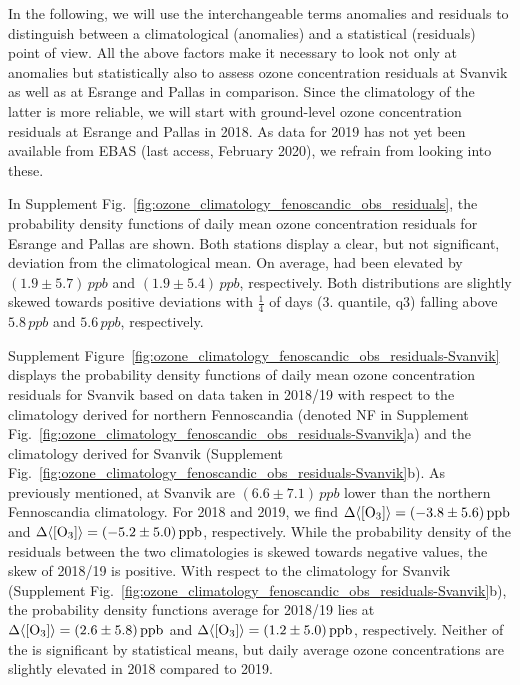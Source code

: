 \documentclass[bg, manuscript]{copernicus}
\begin{document}
In the following, we will use the interchangeable terms anomalies and residuals to distinguish between a climatological (anomalies) and a statistical (residuals) point of view.
All the above factors make it necessary to look not only at anomalies but statistically also to assess ozone concentration residuals at Svanvik as well as at Esrange and Pallas in comparison. Since the climatology of the latter is more reliable, we will start with ground-level ozone concentration residuals \chem{\Delta[O_3]} at Esrange and Pallas in 2018. As data for 2019 has not yet been available from EBAS (last access, February 2020), we refrain from looking into these.

In Supplement Fig.~\ref{fig:ozone_climatology_fenoscandic_obs_residuals}, the probability density functions of daily mean ozone concentration residuals for Esrange and Pallas are shown. Both stations display a clear, but not significant, deviation from the climatological mean. On average, \chem{[O_3]} had been elevated by $(1.9\pm 5.7)\,\unit{ppb}$ and $(1.9\pm 5.4)\,\unit{ppb}$, respectively. Both distributions are slightly skewed towards positive deviations with $\frac{1}{4}$ of days (3. quantile, q3) falling above $5.8\,\unit{ppb}$ and $5.6\,\unit{ppb}$, respectively.

Supplement Figure~\ref{fig:ozone_climatology_fenoscandic_obs_residuals-Svanvik} displays the probability density functions of daily mean ozone concentration residuals for Svanvik based on data taken in 2018/19 with respect to the climatology derived for northern Fennoscandia (denoted NF in Supplement Fig.~\ref{fig:ozone_climatology_fenoscandic_obs_residuals-Svanvik}a) and the climatology derived for Svanvik (Supplement Fig.~\ref{fig:ozone_climatology_fenoscandic_obs_residuals-Svanvik}b).
As previously mentioned, \chem{\left<[O_3]\right>} at Svanvik are $(6.6\pm 7.1)\,\unit{ppb}$ lower than the northern Fennoscandia climatology. For 2018 and 2019, we find $\Delta\chem{\left<[O_3]\right>} = (-3.8\pm 5.6)\,\unit{ppb}$ and $\Delta\chem{\left<[O_3]\right>} = (-5.2\pm 5.0)\,\unit{ppb}$, respectively. While the probability density of the residuals between the two climatologies is skewed towards negative values, the skew of 2018/19 is positive.
With respect to the climatology for Svanvik (Supplement Fig.~\ref{fig:ozone_climatology_fenoscandic_obs_residuals-Svanvik}b), the probability density functions average for 2018/19 lies at $\Delta\chem{\left<[O_3]\right>} = (2.6\pm 5.8)\,\unit{ppb}$ and $\Delta\chem{\left<[O_3]\right>} = (1.2\pm 5.0)\,\unit{ppb}$, respectively.
Neither of the \chem{\Delta\left<[O_3]\right>} is significant by statistical means, but daily average ozone concentrations are slightly elevated in 2018 compared to 2019.
\end{document}
